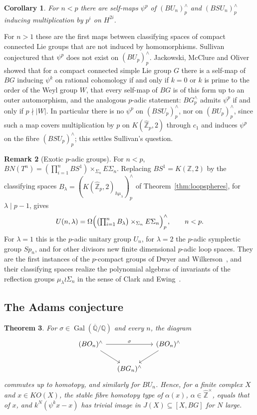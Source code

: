 \documentclass[11pt]{amsart}
\theoremstyle{plain}
\newtheorem{theorem}{Theorem}[section]
\newtheorem{corollary}[theorem]{Corollary}
\theoremstyle{definition}
\newtheorem{remark}[theorem]{Remark}
\numberwithin{equation}{section}
\newcommand{\Z}{\mathbb{Z}}
\newcommand{\Q}{\mathbb{Q}}
\newcommand{\Zhat}{\widehat{\mathbb{Z}}}
\newcommand{\Qbar}{\overline{\mathbb{Q}}}
\newcommand{\KO}{\mathit{KO}}
\newcommand{\units}{^{\times}}
\DeclareMathOperator{\Gal}{Gal}
\begin{document}
\begin{corollary}\label{cor:psip}
For $n<p$ there are self-maps $\psi^p$ of $(BU_n)^\wedge_p$ and $(BSU_n)^\wedge_p$ inducing multiplication by $p^i$ on $H^{2i}$.
\end{corollary}

For $n>1$ these are the first maps between classifying spaces of compact connected Lie groups that are not induced by homomorphisms.
Sullivan conjectured that $\psi^p$ does not exist on $(BU_p)^\wedge_p$.
Jackowski, McClure and Oliver~\cite{JMO} showed that for a compact connected simple Lie group $G$ there is a self-map of $BG$ inducing $\psi^k$ on rational cohomology if and only if $k=0$ or $k$ is prime to the order of the Weyl group $W$, that every self-map of $BG$ is of this form up to an outer automorphism, and the analogous $p$-adic statement: $BG^\wedge_p$ admits $\psi^p$ if and only if $p\nmid|W|$.
In particular there is no $\psi^p$ on $(BSU_p)^\wedge_p$, nor on $(BU_p)^\wedge_p$, since such a map covers multiplication by $p$ on $K(\Zhat_p,2)$ through $c_1$ and induces $\psi^p$ on the fibre $(BSU_p)^\wedge_p$; this settles Sullivan's question.

\begin{remark}[Exotic $p$-adic groups]
For $n<p$, $B N(T^n)=(\prod_{i=1}^nBS^1)\times_{\Sigma_n}E\Sigma_n$.
Replacing $BS^1=K(\Z,2)$ by the classifying spaces $B_\lambda=(K(\Zhat_p,2)_{h\mu_\lambda})^\wedge_p$ of Theorem~\ref{thm:loopspheres}, for $\lambda\mid p-1$, gives
\[
U(n,\lambda)=\Omega\Bigl(\bigl(\textstyle\prod_{i=1}^nB_\lambda\bigr)\times_{\Sigma_n}E\Sigma_n\Bigr)^\wedge_p,\qquad n<p.
\]
For $\lambda=1$ this is the $p$-adic unitary group $U_n$, for $\lambda=2$ the $p$-adic symplectic group $Sp_n$, and for other divisors new finite dimensional $p$-adic loop spaces.
They are the first instances of the $p$-compact groups of Dwyer and Wilkerson~\cite{DwyerWilkerson}, and their classifying spaces realize the polynomial algebras of invariants of the reflection groups $\mu_\lambda\wr\Sigma_n$ in the sense of Clark and Ewing~\cite{ClarkEwing}.
\end{remark}

\subsection{The Adams conjecture}

\begin{theorem}\label{thm:adamsconj}
For $\sigma\in\Gal(\Qbar/\Q)$ and every $n$, the diagram
\[
\begin{tikzcd}[column sep=small]
(BO_n)^\wedge\arrow[rr,"\sigma"]\arrow[rd] && (BO_n)^\wedge\arrow[ld]\\
& (BG_n)^\wedge &
\end{tikzcd}
\]
commutes up to homotopy, and similarly for $BU_n$.
Hence, for a finite complex $X$ and $x\in\KO(X)$, the stable fibre homotopy type of $\alpha(x)$, $\alpha\in\Zhat\units$, equals that of $x$, and $k^N(\psi^kx-x)$ has trivial image in $J(X)\subseteq[X,BG]$ for $N$ large.
\end{theorem}
\end{document}
